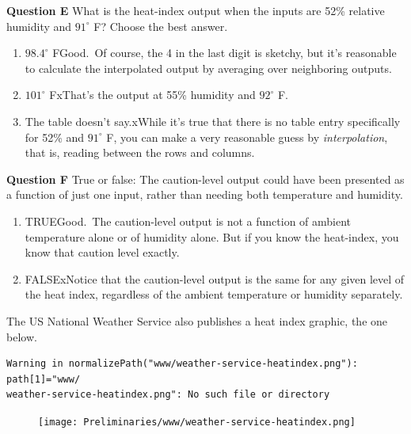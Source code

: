 \documentclass[
  letterpaper,
  DIV=11,
  numbers=noendperiod,
  oneside]{article}
\providecommand{\tightlist}{%
  \setlength{\itemsep}{0pt}\setlength{\parskip}{0pt}}\usepackage{longtable,booktabs,array}
\begin{document}
\begin{multicols}{2}
\textbf{Question E} What is the heat-index output when the inputs are
52\% relative humidity and \(91^\circ\) F? Choose the best answer.

\begin{enumerate}
\def\labelenumi{\roman{enumi}.}
\tightlist
\item
  {\(98.4^\circ\) F{Good.~Of course, the 4 in the last digit is sketchy,
  but it's reasonable to calculate the interpolated output by averaging
  over neighboring outputs.}}\\
\item
  {\(101^\circ\) F{xThat's the output at 55\% humidity and
  \(92^\circ\) F.}}\\
\item
  {The table doesn't say.{xWhile it's true that there is no table
  entry specifically for 52\% and \(91^\circ\) F, you can make a very
  reasonable guess by \emph{interpolation}, that is, reading between the
  rows and columns.}}
\end{enumerate}

\textbf{Question F} True or false: The caution-level output could have
been presented as a function of just one input, rather than needing both
temperature and humidity.

\begin{enumerate}
\def\labelenumi{\roman{enumi}.}
\tightlist
\item
  {TRUE{Good.~The caution-level output is not a function of ambient
  temperature alone or of humidity alone. But if you know the
  heat-index, you know that caution level exactly.}}\\
\item
  {FALSE{xNotice that the caution-level output is the same for any
  given level of the heat index, regardless of the ambient temperature
  or humidity separately.}}
\end{enumerate}

The US National Weather Service also publishes a heat index graphic, the
one below.

\begin{verbatim}
Warning in normalizePath("www/weather-service-heatindex.png"): path[1]="www/
weather-service-heatindex.png": No such file or directory
\end{verbatim}

\begin{figure}

{\centering \texttt{[image: Preliminaries/www/weather-service-heatindex.png]}

}
\end{figure}
\end{multicols}
\end{document}
